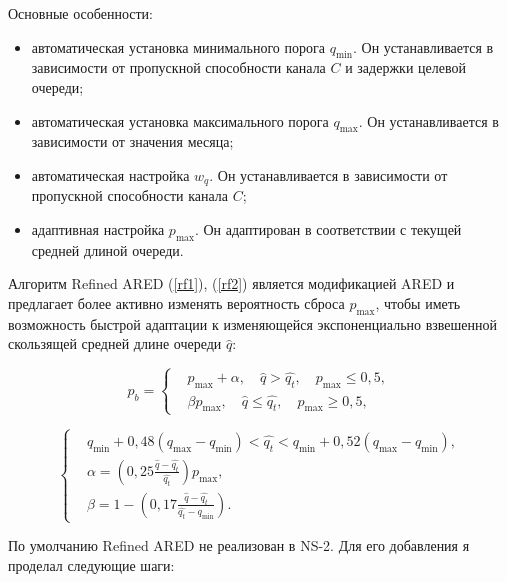 Основные особенности: 
\begin{itemize}
\item автоматическая установка минимального порога $q_{\min}$. Он
  устанавливается в зависимости от пропускной способности канала $C$ и
  задержки целевой очереди;
\item автоматическая установка максимального порога $q_{\max}$. Он
  устанавливается в зависимости от значения месяца;
\item автоматическая настройка $w_{q}$. Он устанавливается в
  зависимости от пропускной способности канала $C$;
\item адаптивная настройка $p_{\max}$. Он адаптирован в соответствии с
  текущей средней длиной очереди.
\end{itemize}

Алгоритм Refined ARED (\ref{rf1}), (\ref{rf2}) является модификацией
ARED и предлагает более активно изменять вероятность сброса $p_{\max}$,
чтобы иметь возможность быстрой адаптации к изменяющейся
экспоненциально взвешенной скользящей средней длине очереди $\hat{q}$:

\begin{equation}
\label{rf1}
p_{b} = \left\{
  \begin{aligned}
& p_{\max}+\alpha, \quad  \hat{q}>\hat{q_{t}}, \quad p_{\max} \leqslant 0,5, \\
& \beta p_{\max}, \quad \hat{q}\leqslant\hat{q_{t}}, \quad p_{\max} \geqslant 0,5,
  \end{aligned}
\right.
\end{equation}

\begin{equation}
\label{rf2}
\left\{
  \begin{aligned}
    & q_{\min}+0,48\left(q_{\max}-q_{\min}\right) < \hat{q_t} < q_{\min}+0,52\left(q_{\max}-q_{\min}\right), \\
    & \alpha=\left(0,25\frac{\hat{q}-\hat{q_t}}{\hat{q_t}} \right)p_{\max}, \\ 
    & \beta=1-\left(0,17\frac{\hat{q}-\hat{q_t}}{\hat{q_t}-q_{\min}}\right).
  \end{aligned}
\right.
\end{equation}


По умолчанию Refined ARED не реализован в NS-2. Для его добавления я
проделал следующие шаги:

